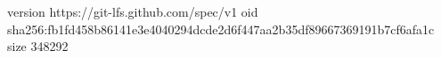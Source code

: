 version https://git-lfs.github.com/spec/v1
oid sha256:fb1fd458b86141e3e4040294dcde2d6f447aa2b35df89667369191b7cf6afa1c
size 348292
